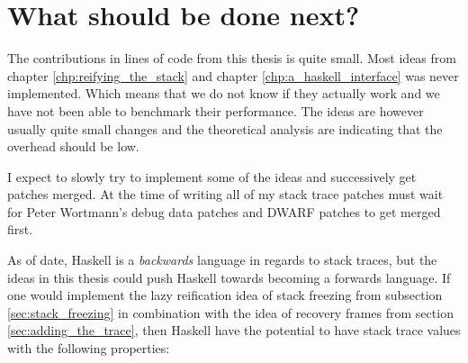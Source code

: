 \section{What should be done next?}

The contributions in lines of code from this thesis is quite small.
Most ideas from chapter \ref{chp:reifying_the_stack} and chapter
\ref{chp:a_haskell_interface} was never implemented. Which means that we
do not know if they actually work and we have not been able to benchmark
their performance. The ideas are however usually quite small changes and
the theoretical analysis are indicating that the overhead should be low.

I expect to slowly try to implement some of the ideas and successively
get patches merged. At the time of writing all of my stack trace patches
must wait for Peter Wortmann's debug data patches and DWARF patches to
get merged first.

As of date, Haskell is a \emph{backwards} language in regards to stack
traces, but the ideas in this thesis could push Haskell towards becoming
a forwards language. If one would implement the lazy reification
idea of stack freezing from subsection \ref{sec:stack_freezing}
in combination with the idea of recovery frames from section
\ref{sec:adding_the_trace}, then Haskell have the potential to have
stack trace values with the following properties:

